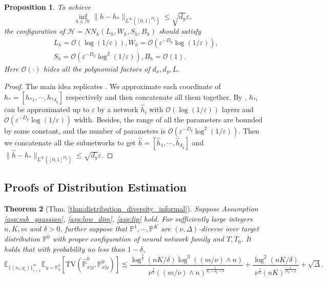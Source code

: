 \documentclass{article}
\numberwithin{equation}{section}
\newcommand{\E}{\mathbb{E}}
\newtheorem{thm}{Theorem}[section]
\newtheorem{prop}[thm]{Proposition}
\theoremstyle{definition}
\renewcommand{\P}{\mathbb{P}}
\begin{document}
\begin{prop}\label{prop:approximation_h}
    To achieve
    \begin{equation}
        \inf_{h\in\mathcal{H}} \|h-h_*\|_{L^\infty([0,1]^{D_y})}\leq \sqrt{d_y}\varepsilon,
    \end{equation}
    the configuration of $\mathcal{H}=NN_h(L_h,W_h,S_h,B_h)$ should satisfy 
    \begin{equation}
        \begin{aligned}
            &L_h=\mathcal{O}\left(\log(1/\varepsilon)\right), W_h=\mathcal{O}\left(\varepsilon^{-D_y}\log(1/\varepsilon)\right), \\
            &S_h=\mathcal{O}\left(\varepsilon^{-D_y}\log^2(1/\varepsilon)\right),
            B_h = \mathcal{O}(1).
        \end{aligned}
    \end{equation}
    Here $\mathcal{O}(\cdot)$ hides all the polynomial factors of $d_x,d_y,L$.  
\end{prop}

\begin{proof}
    The main idea replicates \citet[Theorem 1]{yarotsky2017error}.
    We approximate each coordinate of $h_*=[h_{*1},\cdots,h_{*d_y}]$ respectively and then concatenate all them together.
    By \citet[Theorem 1]{yarotsky2017error}, $h_{*i}$ can be approximated up to $\varepsilon$ by a network $\widehat{h}_i$ with $\mathcal{O}\left(\log(1/\varepsilon)\right)$ layers and $\mathcal{O}\left(\varepsilon^{-D_y}\log(1/\varepsilon)\right)$ width. 
    Besides, the range of all the parameters are bounded by some constant, and the number of parameters is $\mathcal{O}\left(\varepsilon^{-D_y}\log^2(1/\varepsilon)\right)$.
    Then we concatenate all the subnetworks to get $\widehat{h}=[\widehat{h}_1,\cdots,\widehat{h}_{d_y}]$ and $\|\widehat{h}-h_*\|_{L^\infty([0,1]^{D_y})}\leq \sqrt{d_y}\varepsilon$.
\end{proof}

\subsection{Proofs of Distribution Estimation}\label{app:subsec:dist_estimation}

\begin{thm}[Thm. \ref{thm:distribution_diversity_informal}]
\label{thm:distribution_diversity}
    Suppose Assumption \ref{asp:sub_gaussian}, \ref{asp:low_dim}, \ref{asp:lip} hold.
    For sufficiently large integers $n,K,m$ and $\delta>0$, further suppose that $\P^1,\cdots,\P^K$ are $(\nu,\Delta)$-diverse over target distribution $\P^0$ with proper configuration of neural network family and $T,T_0$. It holds that with probability no less than $1-\delta$,
    \begin{equation}
        \E_{\{(x_i,y_i)\}_{i=1}^m}\E_{y\sim\P^0_y} [\mathrm{TV}(\widehat{\P}^0_{x|y},\P^0_{x|y})]
        \lesssim \frac{\log^{\frac{5}{2}}(nK/\delta)\log^3((m/\nu)\wedge n)}{\nu^{\frac{1}{2}}((m/\nu)\wedge n)^{\frac{1}{d_x+d_y+9}}}+\frac{\log^2(nK/\delta)}{\nu^{\frac{1}{2}}(nK)^{\frac{1}{D_y+2}}}+\sqrt{\Delta}.
    \end{equation}
\end{thm}
\end{document}
